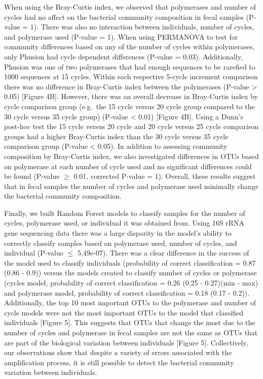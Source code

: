 \documentclass[11pt,]{article}
\begin{document}
When using the Bray-Curtis index, we observed that polymerases and
number of cycles had no affect on the bacterial community composition in
fecal samples (P-value = 1). There was also no interaction between
individuals, number of cycles, and polymerase used (P-value = 1). When
using PERMANOVA to test for community differences based on any of the
number of cycles within polymerases, only Phusion had cycle dependent
differences (P-value = 0.03). Additionally, Phusion was one of two
polymerases that had enough sequences to be rarefied to 1000 sequences
at 15 cycles. Within each respective 5-cycle increment comparison there
was no difference in Bray-Curtis index between the polymerases (P-value
\textgreater{} 0.05) {[}Figure 4B{]}. However, there was an overall
decrease in Bray-Curtis index by cycle comparison group (e.g.~the 15
cycle versus 20 cycle group compared to the 30 cycle versus 35 cycle
group) (P-value \textless{} 0.01) {[}Figure 4B{]}. Using a Dunn's
post-hoc test the 15 cycle versus 20 cycle and 20 cycle versus 25 cycle
comparison groups had a higher Bray-Curtis index than the 30 cycle
versus 35 cycle comparison group (P-value \textless{} 0.05). In addition
to assessing community composition by Bray-Curtis index, we also
investigated differences in OTUs based on polymerase at each number of
cycle used and no significant differences could be found (P-value
\(\geqslant\) 0.01, corrected P-value = 1). Overall, these results
suggest that in fecal samples the number of cycles and polymerase used
minimally change the bacterial community composition.

Finally, we built Random Forest models to classify samples for the
number of cycles, polymerase used, or individual it was obtained from.
Using 16S rRNA gene sequencing data there was a large disparity in the
model's ability to correctly classify samples based on polymerase used,
number of cycles, and individual (P-value \(\leqslant\) 5.49e-07). There
was a clear difference in the success of the model used to classify
individuals (probability of correct classification = 0.87 (0.86 - 0.9))
versus the models created to classify number of cycles or polymerase
(cycles model, probability of correct classification = 0.26 (0.25 -
0.27)(min - max) and polymerase model, probability of correct
classification = 0.18 (0.17 - 0.2)). Additionally, the top 10 most
important OTUs to the polymerase and number of cycle models were not the
most important OTUs to the model that classified individuals {[}Figure
5{]}. This suggests that OTUs that change the most due to the number of
cycles and polymerase in fecal samples are not the same as OTUs that are
part of the biological variation between individuals {[}Figure 5{]}.
Collectively, our observations show that despite a variety of errors
associated with the amplification process, it is still possible to
detect the bacterial community variation between individuals.
\end{document}
